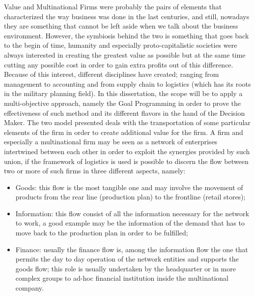 \begin{doublespace}
Value and Multinational Firms were probably the pairs of elements that characterized the way business was done in the last centuries, and still, nowadays they are something that cannot be left aside when we talk about the business environment. However, the symbiosis behind the two is something that goes back to the begin of time, humanity and especially proto-capitalistic societies were always interested in creating the greatest value as possible but at the same time cutting any possible cost in order to gain extra profits out of this difference.
\\
Because of this interest, different disciplines have created; ranging from management to accounting and from supply chain to logistics (which has its roots in the military planning field). In this dissertation, the scope will be to apply a multi-objective approach, namely the Goal Programming in order to prove the effectiveness of such method and its different flavors in the hand of the Decision Maker. The two model presented deals with the transportation of some particular elements of the firm in order to create additional value for the firm. A firm and especially a multinational firm may be seen as a network of enterprises intertwined between each other in order to exploit the synergies provided by such union, if the framework of logistics is used is possible to discern the flow between two or more of such firms in three different aspects, namely:

\begin{itemize}
 \item Goods: this flow is the most tangible one and may involve the movement of products from the rear line (production plan) to the frontline (retail stores);    
\item Information: this flow consist of all the information necessary for the network to work, a good example may be the information of the demand that has to move back to the production plan in order to be fulfilled;
\item Finance: usually the finance flow is, among the information flow the one that permits the day to day operation of the network entities and supports the goods flow; this role is usually undertaken by the headquarter or in more complex groups to ad-hoc financial institution inside the multinational company. 
\end{itemize}


\end{doublespace}
